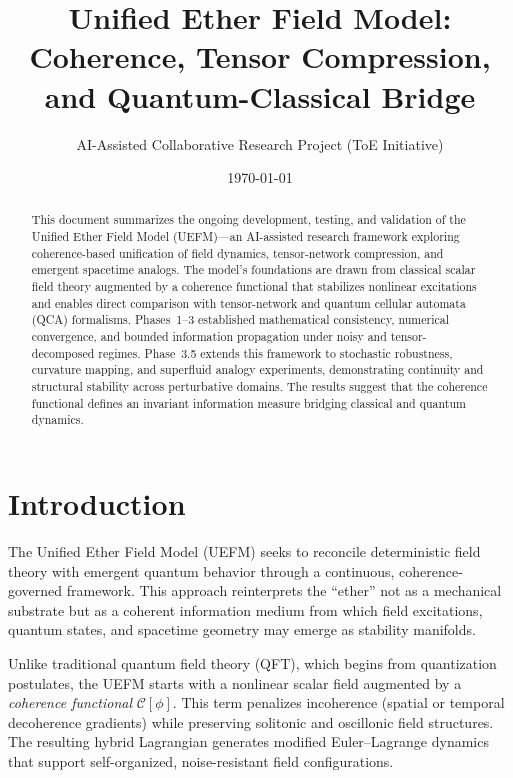 \documentclass[11pt]{article}
\title{\textbf{Unified Ether Field Model: Coherence, Tensor Compression, and Quantum-Classical Bridge}}
\author{AI-Assisted Collaborative Research Project (ToE Initiative)}
\date{\today}
\begin{document}
\maketitle

\begin{abstract}
This document summarizes the ongoing development, testing, and validation of the Unified Ether Field Model (UEFM)—an AI-assisted research framework exploring coherence-based unification of field dynamics, tensor-network compression, and emergent spacetime analogs. The model’s foundations are drawn from classical scalar field theory augmented by a coherence functional that stabilizes nonlinear excitations and enables direct comparison with tensor-network and quantum cellular automata (QCA) formalisms. Phases~1--3 established mathematical consistency, numerical convergence, and bounded information propagation under noisy and tensor-decomposed regimes. Phase~3.5 extends this framework to stochastic robustness, curvature mapping, and superfluid analogy experiments, demonstrating continuity and structural stability across perturbative domains. The results suggest that the coherence functional defines an invariant information measure bridging classical and quantum dynamics. 
\end{abstract}

\tableofcontents

\section{Introduction}

The Unified Ether Field Model (UEFM) seeks to reconcile deterministic field theory with emergent quantum behavior through a continuous, coherence-governed framework. This approach reinterprets the “ether” not as a mechanical substrate but as a coherent information medium from which field excitations, quantum states, and spacetime geometry may emerge as stability manifolds.

Unlike traditional quantum field theory (QFT), which begins from quantization postulates, the UEFM starts with a nonlinear scalar field augmented by a \emph{coherence functional} $\mathcal{C}[\phi]$. This term penalizes incoherence (spatial or temporal decoherence gradients) while preserving solitonic and oscillonic field structures. The resulting hybrid Lagrangian generates modified Euler–Lagrange dynamics that support self-organized, noise-resistant field configurations.
\end{document}
